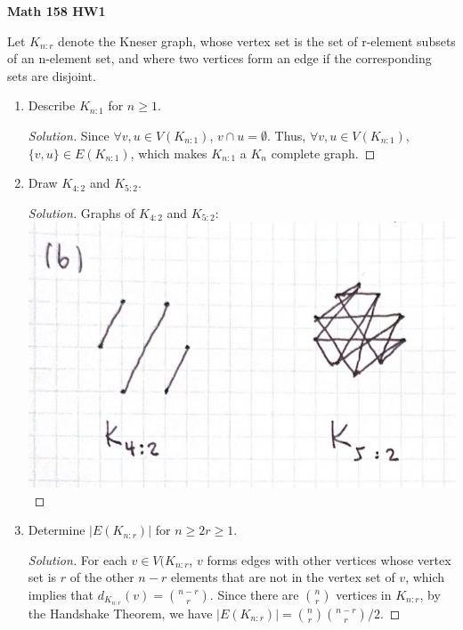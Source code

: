 \documentclass{article}
\newenvironment{problem}[2][Question]{\begin{trivlist}
\item[\hskip \labelsep {\bfseries #1}\hskip \labelsep {\bfseries #2.}]}{\end{trivlist}}
\begin{document}
 

\textbf{Math 158 HW1}

\begin{problem}{1}
    Let $K_{n:r}$ denote the Kneser graph, whose vertex set is the set of r-element subsets of an n-element set, and where two vertices form an edge if the corresponding sets are disjoint.
    \begin{enumerate}[label=(\alph*)]
    \item Describe $K_{n:1}$ for $n \geq 1$.
    \begin{proof}[Solution]
        Since $\forall v,u \in V(K_{n:1})$, $v \cap u = \emptyset$. Thus, $\forall v,u \in V(K_{n:1})$, $\{v, u\} \in E(K_{n:1})$, which makes $K_{n:1}$ a $K_n$ complete graph.
    \end{proof}
    
    \item Draw $K_{4:2}$ and $K_{5:2}$.
    \begin{proof}[Solution]
        Graphs of $K_{4:2}$ and $K_{5:2}$: \\
        \includegraphics[width=\textwidth]{Q172b}
    \end{proof}

    \item Determine $|E({K_{n:r}})|$ for $n \geq 2r \geq 1$.
    
    \begin{proof}[Solution]
        For each $v \in V(K_{n:r}$, $v$ forms edges with other vertices whose vertex set is $r$ of the other $n-r$ elements that are not in the vertex set of $v$, which implies that $d_{K_{n:r}}(v) = {{n-r} \choose {r}}$. Since there are $n \choose r$ vertices in $K_{n:r}$, by the Handshake Theorem, we have  $|E(K_{n:r})| = \binom{n}{r}\binom{n-r}{r}/2$.
    \end{proof}
\end{enumerate}
\end{problem}
\end{document}
